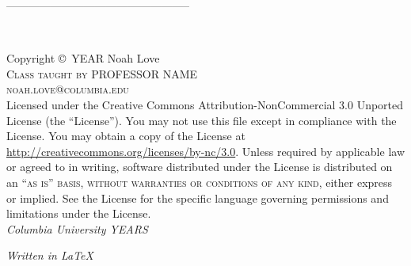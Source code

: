 \documentclass[11pt,fleqn]{book} %
\begin{document}

\begingroup
\thispagestyle{empty} %
\vfill
\endgroup

--------------------------------------------------

\newpage
~\vfill
\thispagestyle{empty}

\noindent Copyright \copyright\ YEAR Noah Love\\ %

\noindent \textsc{Class taught by PROFESSOR NAME}\\ %

\noindent \textsc{noah.love@columbia.edu}\\ %

\noindent Licensed under the Creative Commons Attribution-NonCommercial 3.0 Unported License (the ``License''). You may not use this file except in compliance with the License. You may obtain a copy of the License at \url{http://creativecommons.org/licenses/by-nc/3.0}. Unless required by applicable law or agreed to in writing, software distributed under the License is distributed on an \textsc{``as is'' basis, without warranties or conditions of any kind}, either express or implied. See the License for the specific language governing permissions and limitations under the License.\\ %

\noindent \textit{Columbia University YEARS} %

\noindent \textit{Written in \LaTeX} %

\end{document}
